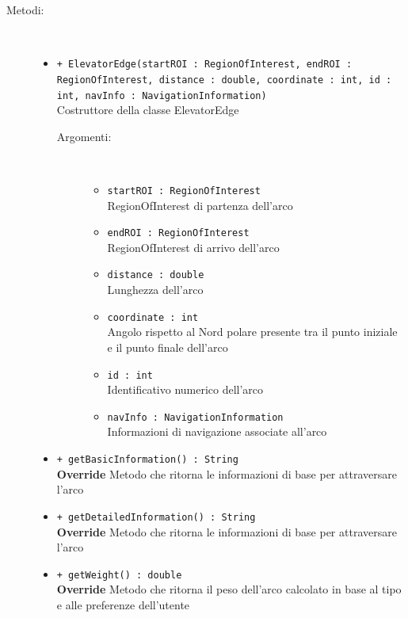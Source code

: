 \documentclass[../DefinizioneDiProdotto.tex]{subfiles}
\begin{document}
\begin{description}
\begin{itemize}
	\end{itemize}
	\item[Metodi:] \
	\begin{itemize}
		\item \texttt{+ ElevatorEdge(startROI : RegionOfInterest, endROI : RegionOfInterest, distance : double, coordinate : int, id : int, navInfo : NavigationInformation)}\\
		Costruttore della classe ElevatorEdge
		\begin{description}
			\item[Argomenti:] \
			\begin{itemize}
				\item \texttt{startROI : RegionOfInterest}\\
				RegionOfInterest di partenza dell'arco\item \texttt{endROI : RegionOfInterest}\\
				RegionOfInterest di arrivo dell'arco\item \texttt{distance : double}\\
				Lunghezza dell'arco\item \texttt{coordinate : int}\\
				Angolo rispetto al Nord polare presente tra il punto iniziale e il punto finale dell'arco\item \texttt{id : int}\\
				Identificativo numerico dell'arco\item \texttt{navInfo : NavigationInformation}\\
				Informazioni di navigazione associate all'arco\end{itemize}
		\end{description}
		\item \texttt{+ getBasicInformation() : String}\\
		\textbf{Override} Metodo che ritorna le informazioni di base per attraversare l'arco
		\item \texttt{+ getDetailedInformation() : String}\\
		\textbf{Override} Metodo che ritorna le informazioni di base per attraversare l'arco
		\item \texttt{+ getWeight() : double}\\
		\textbf{Override} Metodo che ritorna il peso dell'arco calcolato in base al tipo e alle preferenze dell'utente
	\end{itemize}
\end{description}
\end{document}
